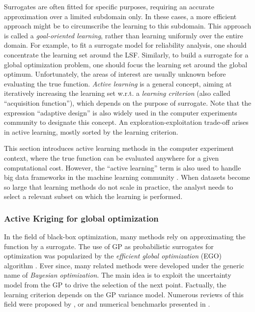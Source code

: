 Surrogates are often fitted for specific purposes, requiring an accurate approximation over a limited subdomain only. 
In these cases, a more efficient approach might be to circumscribe the learning to this subdomain. 
This approach is called a \textit{goal-oriented learning}, rather than learning uniformly over the entire domain. 
For example, to fit a surrogate model for reliability analysis, one should concentrate the learning set around the LSF. 
Similarly, to build a surrogate for a global optimization problem, one should focus the learning set around the global optimum. 
Unfortunately, the areas of interest are usually unknown before evaluating the true function. 
\textit{Active learning} is a general concept, aiming at iteratively increasing the learning set w.r.t. a \textit{learning criterion} (also called ``acquisition function''), which depends on the purpose of surrogate. 
Note that the expression ``adaptive design'' is also widely used in the computer experiments community to designate this concept.   
An exploration-exploitation trade-off arises in active learning, mostly sorted by the learning criterion.

\begin{remark}
    This section introduces active learning methods in the computer experiment context, where the true function can be evaluated anywhere for a given computational cost. 
    However, the ``active learning'' term is also used to handle big data frameworks in the machine learning community \citep{qiu_2016}. 
    When datasets become so large that learning methods do not scale in practice, the analyst needs to select a relevant subset on which the learning is performed.  
\end{remark}

\subsubsection{Active Kriging for global optimization}

In the field of black-box optimization, many methods rely on approximating the function by a surrogate. 
The use of GP as probabilistic surrogates for optimization was popularized by the \textit{efficient global optimization} (EGO) algorithm \citep{jones_1998}. 
Ever since, many related methods were developed under the generic name of \textit{Bayesian optimization}. 
The main idea is to exploit the uncertainty model from the GP to drive the selection of the next point. 
Factually, the learning criterion depends on the GP variance model.  
Numerous reviews of this field were proposed by \citet{shahriari_2015}, or \citet{gramacy_2020_book} and numerical benchmarks presented in \citet{leriche_2021}.

